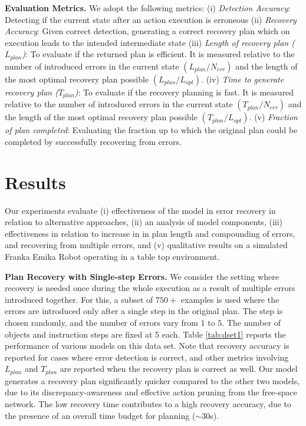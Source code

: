 \textbf{Evaluation Metrics. } We adopt the following metrics: (i) \textit{Detection Accuracy}: Detecting if the current state after an action execution is erroneous  (ii) \textit{Recovery Accuracy}: Given correct detection, generating a correct recovery plan which on execution leads to the intended intermediate state (iii) \textit{Length of recovery plan ($L_{plan}$)}: To evaluate if the returned plan is efficient. It is measured relative to the number of introduced errors in the current state $(L_{plan}/N_{err})$ and the length of the most optimal recovery plan possible $(L_{plan}/L_{opt})$. (iv) \textit{Time to generate recovery plan ($T_{plan}$)}: To evaluate if the recovery planning is fast. It is measured relative to the number of introduced errors in the current state $(T_{plan}/N_{err})$ and the length of the most optimal recovery plan possible $(T_{plan}/L_{opt})$. (v) \textit{Fraction of plan completed}: Evaluating the fraction up to which the original plan could be completed by successfully recovering from errors.

\section{Results}\label{sec:results}
Our experiments evaluate (i) effectiveness of the model in error recovery in relation to alternative approaches, (ii) an analysis of model components, (iii) effectiveness in relation to increase in in plan length and compounding of errors, and recovering from multiple errors, 
and (v) qualitative results on a simulated Franka Emika Robot operating in a table top environment. 

\textbf{Plan Recovery with Single-step Errors.} 
We consider the setting where recovery is needed once during the whole execution as a result of multiple errors introduced together. For this, a subset of $750+$ examples is used where the errors are introduced only after a single step in the original plan. The step is chosen randomly, and the number of errors vary from $1$ to $5$. The number of objects and instruction steps are fixed at 5 each. Table \ref{tab:dset1} reports the performance of various models on this data set. Note that recovery accuracy is reported for cases where error detection is correct, and other metrics involving $L_{plan}$ and $T_{plan}$ are reported when the recovery plan is correct as well. Our model generates a recovery plan significantly quicker compared to the other two models, due to its discrepancy-awareness and effective action pruning from the free-space network. The low recovery time contributes to a high recovery accuracy, due to the presence of an overall time budget for planning ($\sim$30s).

